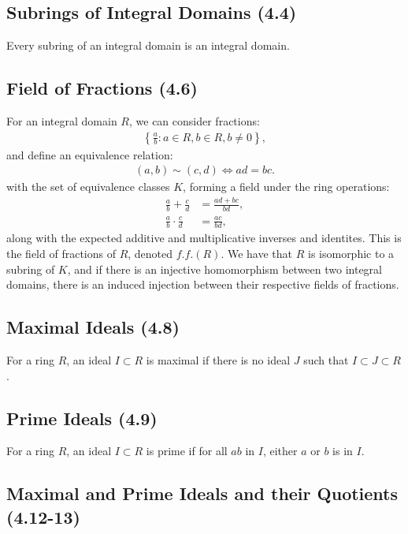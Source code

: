 \subsection{Subrings of Integral Domains (4.4)} \label{4.4}

Every subring of an integral domain is an integral domain.

\newpage

\subsection{Field of Fractions (4.6)} \label{4.6}

For an integral domain $R$, we can consider fractions: \begin{align*}
    \left\{\frac{a}{b} : a \in R, b \in R, b \neq 0\right\},
\end{align*} and define an equivalence relation: \begin{align*}
    (a, b) \sim (c, d) \Longleftrightarrow ad = bc.
\end{align*} with the set of equivalence classes $K$, forming
a field under the ring operations: \begin{align*}
    \frac{a}{b} + \frac{c}{d} &= \frac{ad + bc}{bd}, \\[2mm]
    \frac{a}{b} \cdot \frac{c}{d} &= \frac{ac}{bd},
\end{align*} along with the expected additive and multiplicative
inverses and identites. This is the field of fractions of $R$,
denoted $f.f.(R)$. We have that $R$ is isomorphic to a subring
of $K$, and if there is an injective homomorphism between
two integral domains, there is an induced injection between
their respective fields of fractions.

\subsection{Maximal Ideals (4.8)} \label{4.8}

For a ring $R$, an ideal $I \subset R$ is maximal if there is no
ideal $J$ such that $I \subset J \subset R$.

\subsection{Prime Ideals (4.9)} \label{4.9}

For a ring $R$, an ideal $I \subset R$ is prime if for all $ab$
in $I$, either $a$ or $b$ is in $I$.

\subsection{Maximal and Prime Ideals and their Quotients (4.12-13)}
\label{4.12} \label{4.13}

